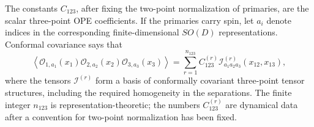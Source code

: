 The constants \(C_{123}\), after fixing the two-point normalization of
primaries, are the scalar three-point OPE coefficients.  If the primaries
carry spin, let \(a_i\) denote indices in the corresponding finite-dimensional
\(SO(D)\) representations.  Conformal covariance says that
\begin{equation}
  \left\langle
    \mathcal O_{1,a_1}(x_1)
    \mathcal O_{2,a_2}(x_2)
    \mathcal O_{3,a_3}(x_3)
  \right\rangle
  =
  \sum_{r=1}^{n_{123}}
  C_{123}^{(r)}
  \mathcal I_{a_1a_2a_3}^{(r)}(x_{12},x_{13}),
  \label{eq:spinning-three-point-structures}
\end{equation}
where the tensors \(\mathcal I^{(r)}\) form a basis of conformally covariant
three-point tensor structures, including the required homogeneity in the
separations.  The finite integer \(n_{123}\) is representation-theoretic; the
numbers \(C_{123}^{(r)}\) are dynamical data after a convention for two-point
normalization has been fixed.

